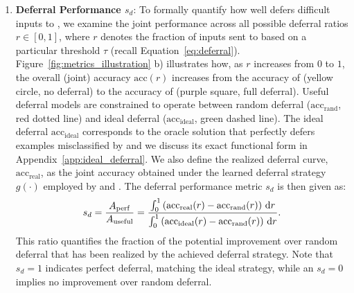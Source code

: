 \begin{enumerate}
    
    \item \textbf{Deferral Performance $s_d$}:  
To formally quantify how well \smallmodel defers difficult inputs to \bigmodel, we examine the joint performance across all possible deferral ratios $r \in [0,1]$, where $r$ denotes the fraction of inputs sent to \bigmodel based on a particular threshold $\tau$ (recall Equation~\eqref{eq:deferral}). Figure~\ref{fig:metrics_illustration} b) illustrates how, as $r$ increases from $0$ to $1$, the overall (joint) accuracy $\text{acc}(r)$ increases from the accuracy of \smallmodel (yellow circle, no deferral) to the accuracy of \bigmodel (purple square, full deferral). Useful deferral models are constrained to operate between random deferral ($\mathrm{acc}_{\mathrm{rand}}$, red dotted line) and ideal deferral ($\mathrm{acc}_{\mathrm{ideal}}$, green dashed line). The ideal deferral $\mathrm{acc}_{\mathrm{ideal}}$ corresponds to the oracle solution that perfectly defers examples misclassified by \smallmodel and we discuss its exact functional form in Appendix~\ref{app:ideal_deferral}. We also define the realized deferral curve, $\mathrm{acc}_{\mathrm{real}}$, as the joint accuracy obtained under the learned deferral strategy $g(\cdot)$ employed by \smallmodel and \bigmodel. The deferral performance metric \( s_d \) is then given as:
\begin{equation}
\label{eq:deferral_performance}
\small
s_d = \frac{A_{\mathrm{perf}}}{A_{\mathrm{useful}}} = \frac{\int_{0}^{1} \left( \mathrm{acc}_{\mathrm{real}}(r) - \mathrm{acc}_{\mathrm{rand}}(r) \right) \, \mathrm{d}r}{\int_{0}^{1} \left( \mathrm{acc}_{\mathrm{ideal}}(r) - \mathrm{acc}_{\mathrm{rand}}(r) \right) \, \mathrm{d}r}.
\end{equation}
This ratio quantifies the fraction of the potential improvement over random deferral that has been realized by the achieved deferral strategy. Note that $s_d = 1$ indicates perfect deferral, matching the ideal strategy, while an $s_d = 0$ implies no improvement over random deferral.




\end{enumerate}
